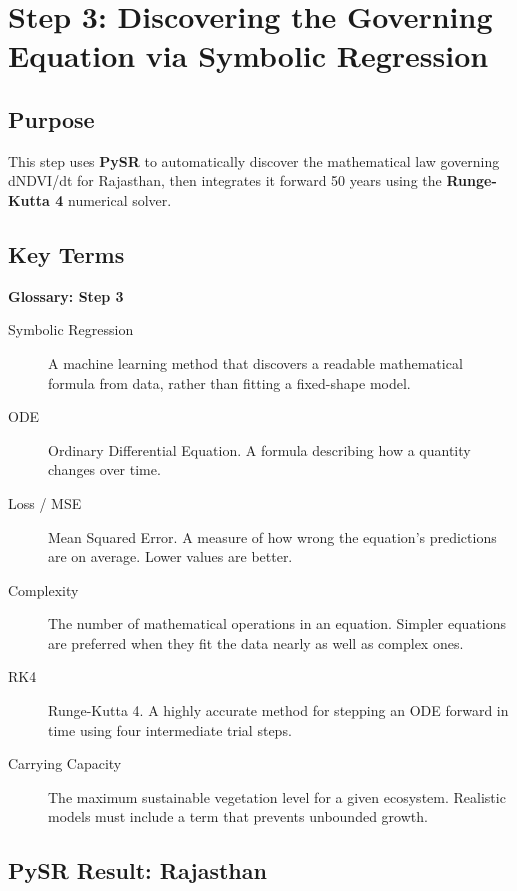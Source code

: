 \documentclass[12pt, a4paper]{article}
\begin{document}
\section{Step 3: Discovering the Governing Equation via Symbolic Regression}
\label{sec:step3}

\subsection{Purpose}

This step uses \textbf{PySR} to automatically discover the mathematical
law governing dNDVI/dt for Rajasthan, then integrates it forward 50 years
using the \textbf{Runge-Kutta 4} numerical solver.

\subsection{Key Terms}

\begin{mdframed}[style=keybox]
\textbf{Glossary: Step 3}\\[6pt]
\begin{description}
    \item[Symbolic Regression] A machine learning method that discovers
    a readable mathematical formula from data, rather than fitting a
    fixed-shape model.
    \item[ODE] Ordinary Differential Equation. A formula describing how
    a quantity changes over time.
    \item[Loss / MSE] Mean Squared Error. A measure of how wrong the
    equation's predictions are on average. Lower values are better.
    \item[Complexity] The number of mathematical operations in an
    equation. Simpler equations are preferred when they fit the data
    nearly as well as complex ones.
    \item[RK4] Runge-Kutta 4. A highly accurate method for stepping an
    ODE forward in time using four intermediate trial steps.
    \item[Carrying Capacity] The maximum sustainable vegetation level for
    a given ecosystem. Realistic models must include a term that prevents
    unbounded growth.
\end{description}
\end{mdframed}

\subsection{PySR Result: Rajasthan}
\end{document}
